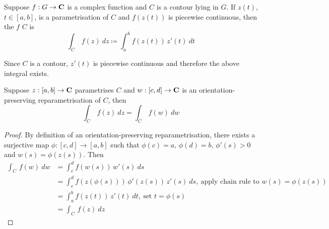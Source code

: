 \begin{definition}
Suppose $f:G \to \mathbf C$ is a complex function and $C$ is a contour lying in $G$. If $z(t)$, $t \in [a,b]$, is a parametrisation of $C$ and $f(z(t))$ is piecewise continuous, then the  {\color{blue}$f$}  {\color{blue}$C$} is
\[\int_C\, f(z)\ dz \coloneqq \int_a^b f(z(t))\,z'(t)\ dt\]
\begin{remark}
Since $C$ is a contour, $z'(t)$ is piecewise continuous and therefore the above integral exists.
\end{remark}
\end{definition}

\vspace*{1em}

\begin{proposition}
Suppose $z:[a,b] \to \mathbf C$ parametrises $C$ and $w:[c,d] \to \mathbf C$ is an orientation-preserving reparametrisation of $C$, then
\[\int_C\,f(z)\ dz = \int_C\, f(w)\ dw\]
\end{proposition}
\begin{proof}
By definition of an orientation-preserving reparametrisation, there exists a surjective map $\phi:[c,d] \to [a,b]$ such that $\phi(c) = a,\,\phi(d) = b,\, \phi'(s) > 0$ and $w(s) = \phi(z(s))$. Then
\begin{align*}
\int_C\, f(w)\ dw &= \int_c^d f(w(s))\,w'(s)\ ds\\[0.5em]
 &= \int_c^d f(z(\phi(s)))\,\phi'(z(s))\,z'(s)\ ds,\ \text{apply chain rule to $w(s) = \phi(z(s))$}\\[0.5em]
 &= \int_a^b f(z(t))\,z'(t)\ dt,\ \text{set $t = \phi(s)$}\\[0.5em]
 &= \int_C\, f(z)\ dz
\end{align*}
\end{proof}

\vspace*{1em}

